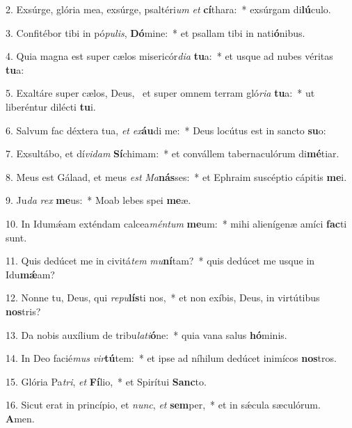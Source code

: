 2. Exsúrge, glória mea, exsúrge, psaltéri\textit{um} \textit{et} \textbf{cí}thara:~*  exsúrgam di\textbf{lú}culo.\

3. Confitébor tibi in pó\textit{pu}\textit{lis}, \textbf{Dó}mine:~*  et psallam tibi in nati\textbf{ó}nibus.\

4. Quia magna est super cælos misericór\textit{di}\textit{a} \textbf{tu}a:~*  et usque ad nubes véritas \textbf{tu}a:\

5. Exaltáre super cælos, Deus, \dag\  et super omnem terram gló\textit{ri}\textit{a} \textbf{tu}a:~*  ut liberéntur dilécti \textbf{tu}i.\

6. Salvum fac déxtera tua, \textit{et} \textit{ex}\textbf{áu}di me:~*  Deus locútus est in sancto \textbf{su}o:\

7. Exsultábo, et dí\textit{vi}\textit{dam} \textbf{Sí}chimam:~*  et convállem tabernaculórum di\textbf{mé}tiar.\

8. Meus est Gálaad, et meus \textit{est} \textit{Ma}\textbf{nás}ses:~*  et Ephraim suscéptio cápitis \textbf{me}i.\

9. Ju\textit{da} \textit{rex} \textbf{me}us:~*  Moab lebes spei \textbf{me}æ.\

10. In Idumǽam exténdam calcea\textit{mén}\textit{tum} \textbf{me}um:~*  mihi alienígenæ amíci \textbf{fac}ti sunt.\

11. Quis dedúcet me in civitá\textit{tem} \textit{mu}\textbf{ní}tam?~*  quis dedúcet me usque in Idu\textbf{mǽ}am?\

12. Nonne tu, Deus, qui \textit{re}\textit{pu}\textbf{lís}ti nos,~*  et non exíbis, Deus, in virtútibus \textbf{nos}tris?\

13. Da nobis auxílium de tribu\textit{la}\textit{ti}\textbf{ó}ne:~*  quia vana salus \textbf{hó}minis.\

14. In Deo facié\textit{mus} \textit{vir}\textbf{tú}tem:~*  et ipse ad níhilum dedúcet inimícos \textbf{nos}tros.\

15. Glória Pa\textit{tri}, \textit{et} \textbf{Fí}lio,~*  et Spirítui \textbf{Sanc}to.\

16. Sicut erat in princípio, et \textit{nunc}, \textit{et} \textbf{sem}per,~*  et in sǽcula sæculórum. \textbf{A}men.\

